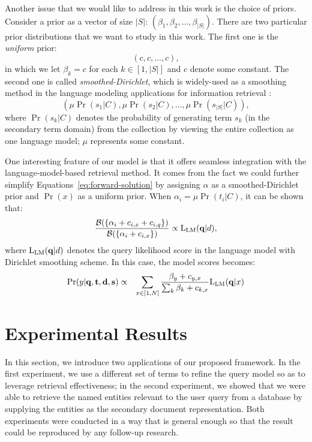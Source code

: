 Another issue that we would like to address in this work is the choice of
priors.  Consider a prior as a vector of size $|S|$: $(\beta_1, \beta_2,
\ldots, \beta_{|S|})$.  There are two particular prior distributions that we
want to study in this work.  The first one is the \emph{uniform} prior: \[ (c, c,
\ldots, c), \] in which we let $\beta_k = c$ for each $k \in [1, |S|]$ and $c$
denote some constant.  The second one is called \emph{smoothed-Dirichlet},
which is widely-used as a smoothing method in the language modeling
applications for information retrieval \cite{zhai2004study}: \[ (\mu
\Pr(s_1|C), \mu \Pr(s_2|C), \ldots, \mu \Pr(s_{|S|}|C)), \] where $\Pr(s_k|C)$
denotes the probability of generating term $s_k$ (in the secondary
term domain) from the collection by viewing the entire collection as one
language model; $\mu$ represents some constant.

One interesting feature of our model is that it offers seamless integration
with the language-model-based retrieval method.  It comes from
the fact we could further simplify Equations~\eqref{eq:forward-solution} by
assigning $\alpha$ as a smoothed-Dirichlet prior and $\Pr(x)$ as a uniform
prior.  When $\alpha_i = \mu \Pr(t_i|C)$, it can be shown that: \[
\frac{\mathcal{B}(\{\alpha_i + c_{i,x} + c_{i,q} \})}{\mathcal{B}(\{\alpha_i +
c_{i,x} \})} \propto {\rm L}_{\rm LM}(\mathbf{q}|d), \] where ${\rm L}_{\rm
LM}(\mathbf{q}|d)$ denotes the query likelihood score in the language model
with Dirichlet smoothing scheme.  In this case, the model scores becomes:
\begin{eqnarray*}
  \Pr(y|\mathbf{q}, \mathbf{t}, \mathbf{d}, \mathbf{s}) &\propto& 
  \sum_{x \in [1, N]} \frac{\beta_y + c_{y,x}}{\sum_k \beta_k + c_{k,x}}
  {\rm L}_{\rm LM}(\mathbf{q}|x) \nonumber\\
\end{eqnarray*} 

\section{Experimental Results}\label{s:experimental-results}

In this section, we introduce two applications of our proposed framework.  In
the first experiment, we use a different set of terms to refine the query model
so as to leverage retrieval effectiveness; in the second experiment, we showed
that we were able to retrieve the named entities relevant to the user query
from a database by supplying the entities as the secondary document
representation.  Both experiments were conducted in a way that is general
enough so that the result could be reproduced by any follow-up research.


